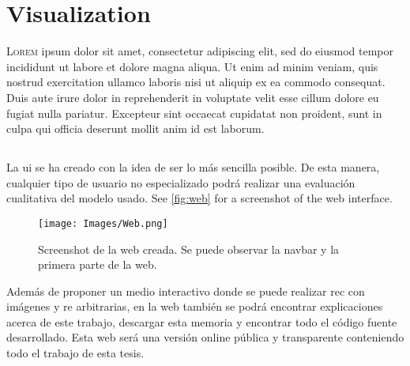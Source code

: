 

\chapter{Visualization}\label{cha:web}



\lettrine{L}{orem} ipsum dolor sit amet, consectetur
adipiscing elit, sed do eiusmod tempor incididunt ut labore et dolore magna
aliqua. Ut enim ad minim veniam, quis nostrud exercitation ullamco laboris nisi
ut aliquip ex ea commodo consequat. Duis aute irure dolor in reprehenderit in
voluptate velit esse cillum dolore eu fugiat nulla pariatur. Excepteur sint
occaecat cupidatat non proident, sunt in culpa qui officia deserunt mollit anim
id est laborum.


\section{}%
\label{sec:frontend}

La \gls{ui} se ha creado con la idea de ser lo más sencilla posible. De esta
manera, cualquier tipo de usuario no especializado podrá realizar una
evaluación cualitativa del modelo usado. See \vref{fig:web} for a screenshot of
the web interface.

\begin{figure}[htb]
  \centering
  \texttt{[image: Images/Web.png]}
  \caption[Screenshot de la web creada]{Screenshot de la web creada. Se puede
    observar la navbar y la primera parte de la web.}\label{fig:web}
\end{figure}

Además de proponer un medio interactivo donde se puede realizar \gls{rec} con
imágenes y \gls{re} arbitrarias, en la web también se podrá encontrar
explicaciones acerca de este trabajo, descargar esta memoria y encontrar todo
el código fuente desarrollado. Esta web será una versión online pública y
transparente conteniendo todo el trabajo de esta tesis.

